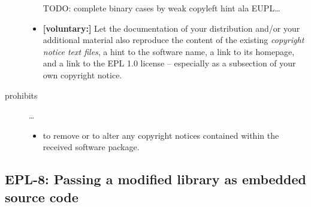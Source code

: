\begin{description}
\begin{itemize}
  TODO: complete binary cases by weak copyleft hint ala EUPL\ldots
 
  \item \textbf{[voluntary:]} Let the documentation of your distribution and/or
  your additional material  also reproduce the content of the existing
  \emph{copyright notice text files}, a hint to the software name, a link to its
  homepage, and a link to the EPL 1.0 license -- especially as a subsection of
  your own copyright notice.
  
\end{itemize}

\item[prohibits] \ldots
\begin{itemize}
  \item to remove or to alter any copyright notices contained within the
  received software package.
\end{itemize}

\end{description}

\subsection{EPL-8: Passing a modified library as embedded source code}
\label{OSUC-10-EPL}

